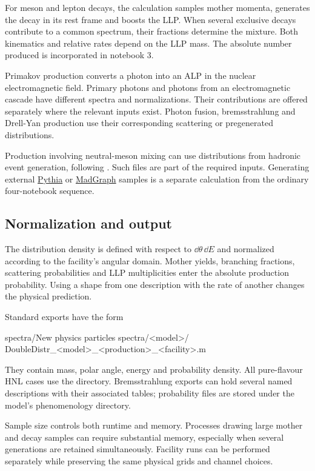 For meson and lepton decays, the calculation samples mother momenta, generates the decay in its rest frame and boosts the LLP. When several exclusive decays contribute to a common spectrum, their fractions determine the mixture. Both kinematics and relative rates depend on the LLP mass. The absolute number produced is incorporated in notebook 3.

Primakov production converts a photon into an ALP in the nuclear electromagnetic field. Primary photons and photons from an electromagnetic cascade have different spectra and normalizations. Their contributions are offered separately where the relevant inputs exist. Photon fusion, bremsstrahlung and Drell-Yan production use their corresponding scattering or pregenerated distributions.

Production involving neutral-meson mixing can use distributions from hadronic event generation, following . Such files are part of the required inputs. Generating external \href{https://pythia.org/}{Pythia} or \href{https://launchpad.net/mg5amcnlo}{MadGraph} samples is a separate calculation from the ordinary four-notebook sequence.

\subsection{Normalization and output}
The distribution density is defined with respect to $\dd\theta\,\dd E$ and normalized according to the facility's angular domain. Mother yields, branching fractions, scattering probabilities and LLP multiplicities enter the absolute production probability. Using a shape from one description with the rate of another changes the physical prediction.

Standard exports have the form
\begin{Code}
spectra/New physics particles spectra/<model>/
  DoubleDistr_<model>_<production>_<facility>.m
\end{Code}
They contain mass, polar angle, energy and probability density. All pure-flavour HNL cases use the  directory. Bremsstrahlung exports can hold several named descriptions with their associated tables; probability files are stored under the model's phenomenology directory.

Sample size controls both runtime and memory. Processes drawing large mother and decay samples can require substantial memory, especially when several generations are retained simultaneously. Facility runs can be performed separately while preserving the same physical grids and channel choices.

